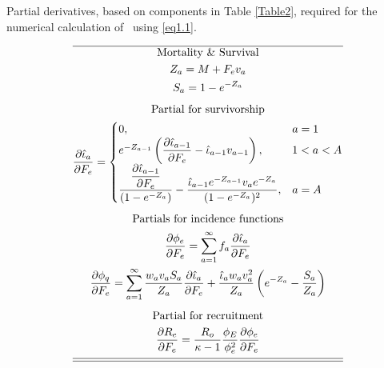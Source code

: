 \begin{table}
  \centering
\caption{Partial derivatives, based on components in Table
\ref{Table2}, required for the numerical calculation of \fmsy\ using \eqref{eq1.1}.}\label{Table3} \tableEq
    \begin{gather}
        \hline
        \mbox{Mortality \& Survival} \nonumber \\
        Z_{a}=M+F_ev_a \label{T3.1} \\
        S_{a}=1-e^{-Z_a}\label{T3.2}\\[1ex]
        \mbox{Partial for survivorship} \nonumber \\
        \frac{\partial \hat{\iota}_a}{\partial F_e} =
        \begin{cases}
          0,& a=1 \label{T3.3}\\
          e^{-Z_{a-1}}\left(\dfrac{\partial \hat{\iota}_{a-1}}{\partial F_e}
           -\hat{\iota}_{a-1}v_{a-1}\right),& 1<a<A\\
           \dfrac{\dfrac{\partial \hat{\iota}_{a-1}}{\partial F_e}}
           {(1-e^{-Z_a})} -
           \dfrac{\hat{\iota}_{a-1} e^{-Z_{a-1}} v_a e^{-Z_a}}
           {(1-e^{-Z_a})^2}, &a=A
        \end{cases} \\[1ex]
        \mbox{Partials for incidence functions} \nonumber \\
        \frac{\partial \phi_e}{\partial F_e}=
            \sum_{a=1}^\infty f_a \frac{\partial \hat{\iota}_a}{\partial F_e} \label{T3.4}\\
        \frac{\partial \phi_q}{\partial F_e}=
            \sum_{a=1}^\infty \frac{w_av_a S_a}{Z_a}
             \frac{\partial \hat{\iota}_a}{\partial F_e}
             +\frac{\hat{\iota}_a w_av_a^2}{Z_a}\left(e^{-Z_a}-\frac{S_a}{Z_a} \right) \label{T3.5}\\[1ex]
        \mbox{Partial for recruitment} \nonumber\\
        \frac{\partial R_e}{\partial F_e}=\frac{R_o}{\kappa-1}
        \frac{\phi_E}{\phi_e^2} \frac{\partial \phi_e}{\partial
        F_e} \label{T3.6}\\[1ex]
        \hline \hline \nonumber
    \end{gather}

    \normalEq
\end{table}
	
